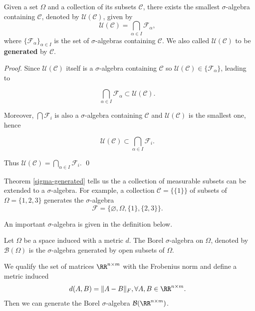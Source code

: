 \begin{theorem}
  \label{sigma-generated}
  Given a set $\Omega$ and a collection of its subsets $\mathcal{C}$, there exists the smallest $\sigma$-algebra containing $\mathcal{C}$, denoted by $\mathcal{U}(\mathcal{C})$, given by
  $$\mathcal{U}(\mathcal{C})=\bigcap\limits_{\alpha\in I}\mathcal{F}_\alpha,$$
  where $\{\mathcal{F}_\alpha\}_{\alpha\in I}$ is the set of $\sigma$-algebras containing $\mathcal{C}$. We also called $\mathcal{U}(\mathcal{C})$ to be \textbf{generated} by $\mathcal{C}$.
\end{theorem}

\textit{Proof.} Since $\mathcal{U}(\mathcal{C})$ itself is a $\sigma$-algebra containing $\mathcal{C}$ so $\mathcal{U}(\mathcal{C})\in\{\mathcal{F}_\alpha\}$, leading to

$$\bigcap\limits_{\alpha\in I}\mathcal{F}_\alpha\subset \mathcal{U}(\mathcal{C}).$$

Moreover, $\bigcap\mathcal{F}_i$ is also a $\sigma$-algebra containing $\mathcal{C}$ and $\mathcal{U}(\mathcal{C})$ is the smallest one, hence

$$\mathcal{U}(\mathcal{C})\subset\bigcap\limits_{\alpha\in I}\mathcal{F}_i.$$

Thus $\mathcal{U}(\mathcal{C})=\bigcap\limits_{\alpha\in I}\mathcal{F}_i$. \qed

\begin{remark}
  Theorem \ref{sigma-generated} tells us the a collection of measurable subsets can be extended to a $\sigma$-algebra. For example, a collection $\mathcal{C}=\{\{1\}\}$ of subsets of $\Omega=\{1,2,3\}$ generates the $\sigma$-algebra
  $$\mathcal{F}=\{\varnothing,\Omega,\{1\},\{2,3\}\}.$$
\end{remark}
An important $\sigma$-algebra is given in the definition below.

\begin{definition}
  Let $\Omega$ be a space induced with a metric $d$. The Borel $\sigma$-algebra on $\Omega$, denoted by $\mathcal{B}(\Omega)$  is the $\sigma$-algebra generated by open subsets of $\Omega$.
\end{definition}

\begin{remark}
  We qualify the set of matrices $\RR^{n\times m}$ with the Frobenius norm and define a metric induced
  $$d(A,B)=\|A-B\|_F,\forall A,B\in \RR^{n\times m}.$$
  Then we can generate the Borel $\sigma$-algebra $\mathcal{B}(\RR^{n\times m})$.
\end{remark}

